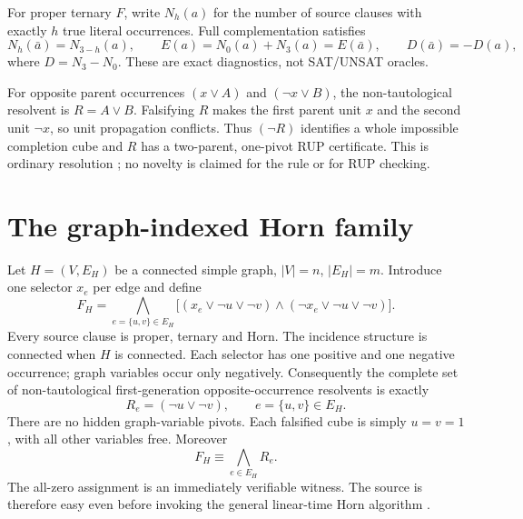\documentclass[11pt]{article}
\begin{document}
For proper ternary $F$, write $N_h(a)$ for the number of source clauses with
exactly $h$ true literal occurrences.  Full complementation satisfies
\[
N_h(\bar a)=N_{3-h}(a),\qquad
E(a)=N_0(a)+N_3(a)=E(\bar a),\qquad
D(\bar a)=-D(a),
\]
where $D=N_3-N_0$.  These are exact diagnostics, not SAT/UNSAT oracles.

For opposite parent occurrences
$(x\vee A)$ and $(\neg x\vee B)$, the non-tautological resolvent is
$R=A\vee B$.  Falsifying $R$ makes the first parent unit $x$ and the second
unit $\neg x$, so unit propagation conflicts.  Thus $(\neg R)$ identifies a
whole impossible completion cube and $R$ has a two-parent, one-pivot RUP
certificate.  This is ordinary resolution \cite{DavisPutnam}; no novelty is
claimed for the rule or for RUP checking.

\section{The graph-indexed Horn family}
Let $H=(V,E_H)$ be a connected simple graph, $|V|=n$, $|E_H|=m$.
Introduce one selector $x_e$ per edge and define
\[
F_H=\bigwedge_{e=\{u,v\}\in E_H}
 \bigl[(x_e\vee\neg u\vee\neg v)\land
       (\neg x_e\vee\neg u\vee\neg v)\bigr].                 \tag{1}
\]
Every source clause is proper, ternary and Horn.  The incidence structure is
connected when $H$ is connected.  Each selector has one positive and one
negative occurrence; graph variables occur only negatively.  Consequently
the complete set of non-tautological first-generation opposite-occurrence
resolvents is exactly
\[
R_e=(\neg u\vee\neg v),\qquad e=\{u,v\}\in E_H.              \tag{2}
\]
There are no hidden graph-variable pivots.  Each falsified cube is simply
$u=v=1$, with all other variables free.  Moreover
\[
F_H\equiv\bigwedge_{e\in E_H}R_e.                            \tag{3}
\]
The all-zero assignment is an immediately verifiable witness.  The source is
therefore easy even before invoking the general linear-time Horn algorithm
\cite{DowlingGallier}.
\end{document}
